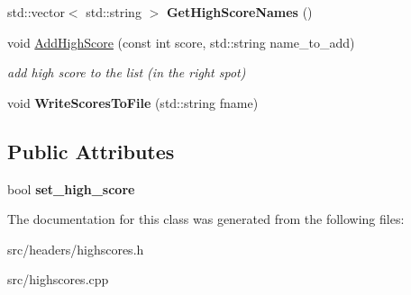 \begin{DoxyCompactItemize}
\item 
std\+::vector$<$ std\+::string $>$ {\bfseries Get\+High\+Score\+Names} ()\hypertarget{classHighScores_add7a2fb14fbfb3797d181cae9b94f5da}{}\label{classHighScores_add7a2fb14fbfb3797d181cae9b94f5da}

\item 
void \hyperlink{classHighScores_a35fdac36e9762833505b14d613cb1b09}{Add\+High\+Score} (const int score, std\+::string name\+\_\+to\+\_\+add)\hypertarget{classHighScores_a35fdac36e9762833505b14d613cb1b09}{}\label{classHighScores_a35fdac36e9762833505b14d613cb1b09}

\begin{DoxyCompactList}\small\item\em add high score to the list (in the right spot) \end{DoxyCompactList}\item 
void {\bfseries Write\+Scores\+To\+File} (std\+::string fname)\hypertarget{classHighScores_a8cf0cc0285a6fc54cc6ec9830062d3aa}{}\label{classHighScores_a8cf0cc0285a6fc54cc6ec9830062d3aa}

\end{DoxyCompactItemize}
\subsection*{Public Attributes}
\begin{DoxyCompactItemize}
\item 
bool {\bfseries set\+\_\+high\+\_\+score}\hypertarget{classHighScores_ac8d5a9428d8ad2c9ccd46778cf21de20}{}\label{classHighScores_ac8d5a9428d8ad2c9ccd46778cf21de20}

\end{DoxyCompactItemize}


The documentation for this class was generated from the following files\+:\begin{DoxyCompactItemize}
\item 
src/headers/highscores.\+h\item 
src/highscores.\+cpp\end{DoxyCompactItemize}
